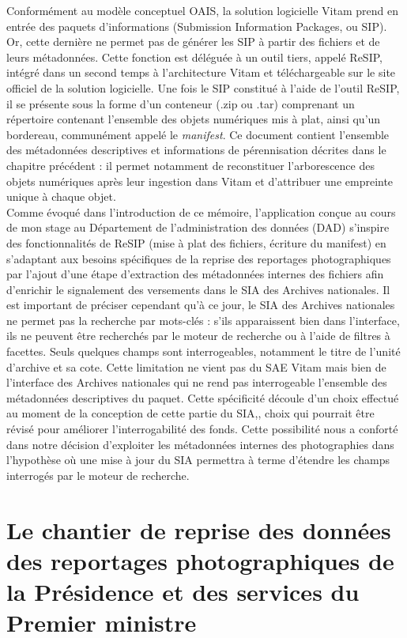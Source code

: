 Conformément au modèle conceptuel OAIS, la solution logicielle Vitam prend en entrée des paquets d’informations (Submission Information Packages, ou SIP). Or, cette dernière ne permet pas de générer les SIP à partir des fichiers et de leurs métadonnées. Cette fonction est déléguée à un outil tiers, appelé ReSIP, intégré dans un second temps à l'architecture Vitam et téléchargeable sur le site officiel de la solution logicielle. Une fois le SIP constitué à l’aide de l’outil ReSIP, il se présente sous la forme d’un conteneur (.zip ou .tar) comprenant un répertoire contenant l’ensemble des objets numériques mis à plat, ainsi qu’un bordereau, communément appelé le \emph{manifest}. Ce document contient l’ensemble des métadonnées descriptives
et informations de pérennisation décrites dans le chapitre précédent : il permet notamment de reconstituer l’arborescence des objets numériques après leur ingestion dans Vitam et d’attribuer une empreinte unique à chaque
objet.
\\

Comme évoqué dans l'introduction de ce mémoire, l'application conçue au cours de mon stage au Département de l'administration des données (DAD) s'inspire des fonctionnalités de ReSIP (mise à plat des fichiers, écriture du manifest) en s'adaptant aux besoins spécifiques de la reprise des reportages photographiques par l'ajout d'une étape d'extraction des métadonnées internes des fichiers afin d'enrichir le signalement des versements dans le SIA des Archives nationales. Il est important de préciser cependant qu'à ce jour, le SIA des Archives nationales ne permet pas la recherche par mots-clés : s'ils apparaissent bien dans l'interface, ils ne peuvent être recherchés par le moteur de recherche ou à l'aide de filtres à facettes. Seuls quelques champs sont interrogeables, notamment le titre de l'unité d'archive et sa cote. Cette limitation ne vient pas du SAE Vitam mais bien de l'interface des Archives nationales qui ne rend pas interrogeable l'ensemble des métadonnées descriptives du paquet. Cette spécificité découle d'un choix effectué au moment de la conception de cette partie du SIA,, choix qui pourrait être révisé pour améliorer l'interrogabilité des fonds. Cette possibilité nous a conforté dans notre décision d'exploiter les métadonnées internes des photographies dans l'hypothèse où une mise à jour du SIA permettra à terme d'étendre les champs interrogés par le moteur de recherche.

\section{Le chantier de reprise des données des reportages photographiques de la Présidence et des services du Premier ministre}

